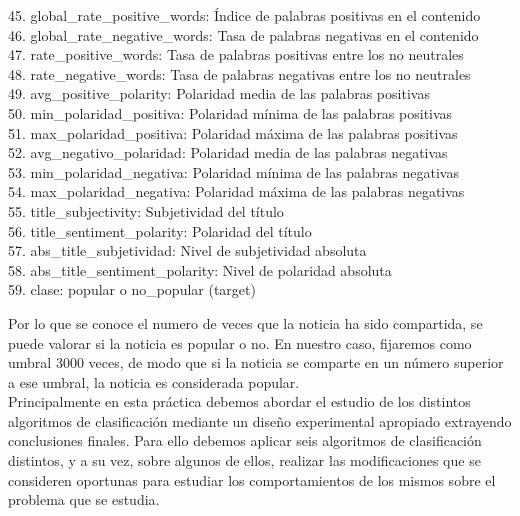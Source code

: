 		45. global\_rate\_positive\_words:   			\hfill Índice de palabras positivas en el contenido \\
		46. global\_rate\_negative\_words:   			\hfill Tasa de palabras negativas en el contenido \\
		47. rate\_positive\_words:          			\hfill Tasa de palabras positivas entre los no neutrales  \\
		48. rate\_negative\_words:          			\hfill Tasa de palabras negativas entre los no neutrales  \\
		49. avg\_positive\_polarity:         			\hfill Polaridad media de las palabras positivas \\
		50. min\_polaridad\_positiva:        			\hfill Polaridad mínima de las palabras positivas \\
		51. max\_polaridad\_positiva:        			\hfill Polaridad máxima de las palabras positivas \\
		52. avg\_negativo\_polaridad:        			\hfill Polaridad media de las palabras negativas \\
		53. min\_polaridad\_negativa:        			\hfill Polaridad mínima de las palabras negativas \\
		54. max\_polaridad\_negativa:       			\hfill Polaridad máxima de las palabras negativas \\
		55. title\_subjectivity:           			\hfill Subjetividad del título \\
		56. title\_sentiment\_polarity:     			\hfill Polaridad del título \\
		57. abs\_title\_subjetividad:       			\hfill Nivel de subjetividad absoluta \\
		58. abs\_title\_sentiment\_polarity:			\hfill Nivel de polaridad absoluta \\
		59. clase:									\hfill popular o no\_popular (target) \\		
		
	\vspace{1mm}
	
	Por lo que se conoce el numero de veces que la noticia ha sido compartida, 
	se puede valorar si la noticia es popular o no. En nuestro caso, fijaremos como umbral 3000
	veces, de modo que si la noticia se comparte en un número superior a ese umbral, la noticia es
	considerada popular. \\

	Principalmente en esta práctica debemos abordar el estudio de los distintos algoritmos de clasificación
	mediante un diseño experimental apropiado extrayendo conclusiones finales.
	Para ello debemos aplicar seis algoritmos de clasificación distintos, y a su vez, sobre algunos de ellos, realizar 
	las modificaciones que se consideren oportunas para estudiar los comportamientos de los mismos sobre el problema que se estudia. \\


